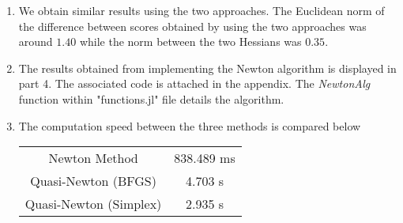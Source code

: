 \documentclass[landscape]{article} %
\theoremstyle{definition}
\begin{document}
\begin{enumerate}

	\item We obtain similar results using the two approaches. The Euclidean norm of the difference between scores obtained by using the two approaches was around $ 1.40$ while the norm between the two Hessians was $ 0.35 $.
	
	
	\item The results obtained from implementing the Newton algorithm is displayed in part 4. The associated code is attached in the appendix. The \textit{NewtonAlg} function within  "functions.jl" file details the algorithm.
	
	
	\item  The computation speed between the three methods is compared below
	\begin{table}[H]
		\centering
		\begin{tabular}{c c }
			\hline
			Newton Method & 838.489 ms\\
			Quasi-Newton (BFGS) & 4.703 s\\
			Quasi-Newton (Simplex) & 2.935 s\\\hline
		\end{tabular}
	\end{table}
	

\end{enumerate}
\end{document}
